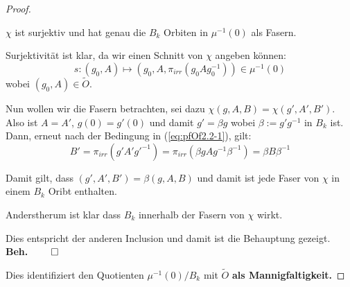 \begin{proof}
\begin{comment}
  & \text{\color{red}so ist das falsch?!?}
\\&=g(0)g(0)^{-1}+g(0)(g_i)^{-1}\xi^1+\dots+g(0)(g_k)^{-1}\xi^k
\\&=1+g(0)(g_i)^{-1}\xi^1+\dots+g(0)(g_k)^{-1}\xi^k \in B_k
\end{align*}
ODER.
\[
(g(0))^{-1} \overset{\text{\color{red}?}}= g^{-1}(0)
\]
\end{comment}
\begin{beh}
$\chi$ ist surjektiv und hat genau die $B_k$ Orbiten in $\mu^{-1}(0)$ als
Fasern.
\end{beh}
Surjektivität ist klar, da wir einen Schnitt von $\chi$ angeben können:
\[
s:(g_0,A)\mapsto (g_0,A,\pi_{irr}(g_0Ag_0^{-1}))\in\mu^{-1}(0)
\]
wobei $(g_0,A)\in\tilde O$.
\begin{comment}
\[
\chi\circ s=\Big((g_0,A)\overset s\mapsto(g_0,A,\pi_{irr}(g_0Ag_0^{-1}))
  \overset\chi\mapsto(\underset{=g_0}{\underbrace{g_0(0)}},A)\Big)
  =\id_{\mu^{-1}(0)}
\]
\end{comment}
Nun wollen wir die Fasern betrachten, sei dazu $\chi(g,A,B)=\chi(g',A',B')$.
Also ist $A=A'$, $g(0)=g'(0)$ und damit $g'=\beta g$ wobei $\beta:=g'g^{-1}$ in
$B_k$ ist.
Dann, erneut nach der Bedingung in (\ref{eq:pfOf2.2-1}), gilt:
\[
B'=\pi_{irr}(g'A'g'^{-1})=\pi_{irr}(\beta gAg^{-1}\beta^{-1})=\beta B\beta^{-1}
\]
\begin{comment}
\begin{align*}
B'&\overset{(\ref{eq:pfOf2.2-1})}=
  \pi_{irr}(g'A'g'^{-1})  \overset{A'=A}{=}
    \pi_{irr}\left(g'\left(g^{-1}g\right)A\left(g^{-1}g\right)g'^{-1}\right)
    =\pi_{irr}(\beta gAg^{-1}\beta^{-1})
\\& =\beta \pi_{irr}(gAg^{-1}) \beta^{-1}
    \overset{(\ref{eq:pfOf2.2-1})}=\beta B\beta^{-1}
\end{align*}
\end{comment}
Damit gilt, dass $(g',A',B')=\beta(g,A,B)$ und damit ist jede Faser von $\chi$
in einem $B_k$ Oribt enthalten.
\begin{comment}
Also(?):
\begin{align*}
\beta(g,A,B) 
  &\overset{!}=(\beta g,A,\beta B\beta^{-1})
\\&=(g',A',B')
\end{align*}
\end{comment}
Anderstherum ist klar dass $B_k$ innerhalb der Fasern von $\chi$ wirkt.
\begin{comment}
Wie sieht die $B_k$-Wirkung auf $\mu^{-1}(0)$ aus?
Sei $\beta\in B_k$ und $(g,A,B)\in\mu^{-1}(0)$ so...
\end{comment}
Dies entspricht der anderen Inclusion und damit ist die Behauptung gezeigt.
{\hfill \textbf{Beh.} \ensuremath{\qed}}

Dies identifiziert den Quotienten $\mu^{-1}(0)/B_k$ mit $\tilde O$ \textbf{als
Mannigfaltigkeit.}

\TODO
\end{proof}

